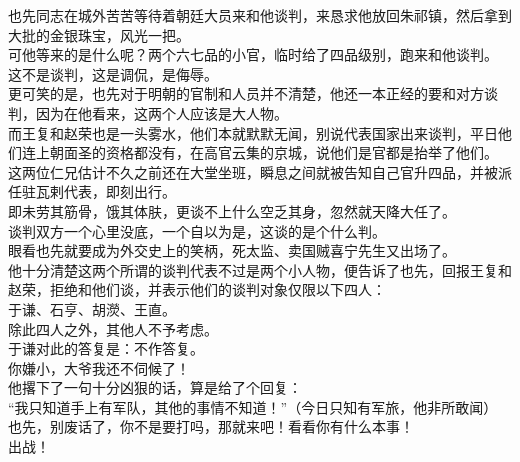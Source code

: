 \begin{multicols}{\theparacolNo}
也先同志在城外苦苦等待着朝廷大员来和他谈判，来恳求他放回朱祁镇，然后拿到大批的金银珠宝，风光一把。\\

可他等来的是什么呢？两个六七品的小官，临时给了四品级别，跑来和他谈判。\\

这不是谈判，这是调侃，是侮辱。\\

更可笑的是，也先对于明朝的官制和人员并不清楚，他还一本正经的要和对方谈判，因为在他看来，这两个人应该是大人物。\\

而王复和赵荣也是一头雾水，他们本就默默无闻，别说代表国家出来谈判，平日他们连上朝面圣的资格都没有，在高官云集的京城，说他们是官都是抬举了他们。\\

这两位仁兄估计不久之前还在大堂坐班，瞬息之间就被告知自己官升四品，并被派任驻瓦剌代表，即刻出行。\\

即未劳其筋骨，饿其体肤，更谈不上什么空乏其身，忽然就天降大任了。\\

谈判双方一个心里没底，一个自以为是，这谈的是个什么判。\\

眼看也先就要成为外交史上的笑柄，死太监、卖国贼喜宁先生又出场了。\\

他十分清楚这两个所谓的谈判代表不过是两个小人物，便告诉了也先，回报王复和赵荣，拒绝和他们谈，并表示他们的谈判对象仅限以下四人：\\

于谦、石亨、胡濙、王直。\\

除此四人之外，其他人不予考虑。\\

于谦对此的答复是：不作答复。\\

你嫌小，大爷我还不伺候了！\\

他撂下了一句十分凶狠的话，算是给了个回复：\\

“我只知道手上有军队，其他的事情不知道！”（今日只知有军旅，他非所敢闻）\\

也先，别废话了，你不是要打吗，那就来吧！看看你有什么本事！\\

出战！\\


\end{multicols}
